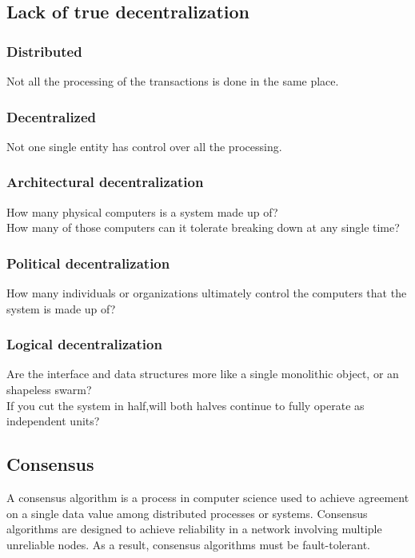 \documentclass[]{article}
\begin{document}
	\subsection{Lack of true decentralization}
	
	\subsubsection{\textbf{Distributed}}
	Not all the processing of the transactions is done in the same place. 
		
	\subsubsection{\textbf{Decentralized}}
	Not one single entity has control over all the processing.
	
	\subsubsection{Architectural decentralization} 
	How many physical computers is a system made up of?\\ 
	How many of those computers can it tolerate breaking down at any single time?\\
	\subsubsection{Political decentralization} 
	How many individuals or organizations ultimately control the computers that the system is made up of?\\
	\subsubsection{Logical decentralization} 
	Are the interface and data structures more like a single monolithic object, or an shapeless swarm? \\
	If you cut the system in half,will both halves continue to fully operate as independent units?

	\subsection{Consensus}
	 A consensus algorithm is a process in computer science used to achieve agreement on a single data value among distributed processes or systems. Consensus algorithms are designed to achieve reliability in a network involving multiple unreliable nodes. As a result, consensus algorithms must be fault-tolerant.
\end{document}
